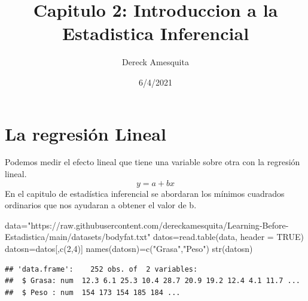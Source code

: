 \documentclass[
]{article}
\title{Capitulo 2: Introduccion a la Estadistica Inferencial}
\author{Dereck Amesquita}
\date{6/4/2021}
\newenvironment{Shaded}{\begin{snugshade}}{\end{snugshade}}
\newcommand{\AttributeTok}[1]{\textcolor[rgb]{0.77,0.63,0.00}{#1}}
\newcommand{\CommentTok}[1]{\textcolor[rgb]{0.56,0.35,0.01}{\textit{#1}}}
\newcommand{\ConstantTok}[1]{\textcolor[rgb]{0.00,0.00,0.00}{#1}}
\newcommand{\DecValTok}[1]{\textcolor[rgb]{0.00,0.00,0.81}{#1}}
\newcommand{\FunctionTok}[1]{\textcolor[rgb]{0.00,0.00,0.00}{#1}}
\newcommand{\NormalTok}[1]{#1}
\newcommand{\OtherTok}[1]{\textcolor[rgb]{0.56,0.35,0.01}{#1}}
\newcommand{\SpecialCharTok}[1]{\textcolor[rgb]{0.00,0.00,0.00}{#1}}
\newcommand{\StringTok}[1]{\textcolor[rgb]{0.31,0.60,0.02}{#1}}
\begin{document}
\maketitle

\hypertarget{la-regresiuxf3n-lineal}{%
\section{La regresión Lineal}\label{la-regresiuxf3n-lineal}}

Podemos medir el efecto lineal que tiene una variable sobre otra con la
regresión lineal. \[y = a+bx\] En el capitulo de estadística inferencial
se abordaran los mínimos cuadrados ordinarios que nos ayudaran a obtener
el valor de b.

\begin{Shaded}
\begin{Highlighting}[]
\NormalTok{data}\OtherTok{=}\StringTok{"https://raw.githubusercontent.com/dereckamesquita/Learning{-}Before{-}Estadistica/main/datasets/bodyfat.txt"}
\NormalTok{datos}\OtherTok{=}\FunctionTok{read.table}\NormalTok{(data, }\AttributeTok{header =} \ConstantTok{TRUE}\NormalTok{)}
\NormalTok{datosn}\OtherTok{=}\NormalTok{datos[,}\FunctionTok{c}\NormalTok{(}\DecValTok{2}\NormalTok{,}\DecValTok{4}\NormalTok{)]}
\FunctionTok{names}\NormalTok{(datosn)}\OtherTok{=}\FunctionTok{c}\NormalTok{(}\StringTok{"Grasa"}\NormalTok{,}\StringTok{"Peso"}\NormalTok{)}
\FunctionTok{str}\NormalTok{(datosn)}
\end{Highlighting}
\end{Shaded}

\begin{verbatim}
## 'data.frame':    252 obs. of  2 variables:
##  $ Grasa: num  12.3 6.1 25.3 10.4 28.7 20.9 19.2 12.4 4.1 11.7 ...
##  $ Peso : num  154 173 154 185 184 ...
\end{verbatim}

\begin{Shaded}
\end{Shaded}
\end{document}

